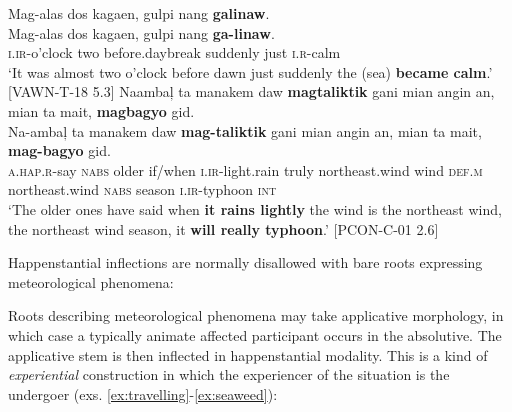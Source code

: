 \newpage
\ea
Mag-alas  dos  kagaen,  gulpi  nang  \textbf{galinaw}. \\\smallskip
\gll Mag-alas  dos  kagaen,  gulpi  nang  \textbf{ga-linaw}. \\
\textsc{i.ir}-o’clock  two  before.daybreak  suddenly  just  \textsc{i.r}-calm \\
\glt ‘It was almost two o’clock before dawn just suddenly the (sea) \textbf{became calm}.’ [VAWN-T-18 5.3]
\z
\ea
Naambaļ  ta  manakem  daw  \textbf{magtaliktik}  gani  mian  angin  an, mian ta mait,  \textbf{magbagyo}  gid. \\\smallskip
\gll Na-ambaļ  ta  manakem  daw  \textbf{mag-taliktik}  gani  mian  angin  an, mian ta mait,  \textbf{mag-bagyo}  gid. \\
\textsc{a.hap.r}-say  \textsc{nabs}  older  if/when  \textsc{i.ir}-light.rain  truly  northeast.wind  wind \textsc{def.m} northeast.wind \textsc{nabs} season  \textsc{i.ir}-typhoon  \textsc{int} \\
\glt ‘The older ones have said when \textbf{it rains lightly} the wind is the northeast wind, the northeast wind season, it \textbf{will really typhoon}.’ [PCON-C-01 2.6]
\z

Happenstantial inflections are normally disallowed with bare roots expressing meteorological phenomena:

\ea
    \z
\z

Roots describing meteorological phenomena may take applicative morphology, in which case a typically animate affected participant occurs in the absolutive. The applicative stem is then inflected in happenstantial modality. This is a kind of \textit{experiential} construction in which the experiencer of the situation is the undergoer  (exs. \ref{ex:travelling}-\ref{ex:seaweed}):


